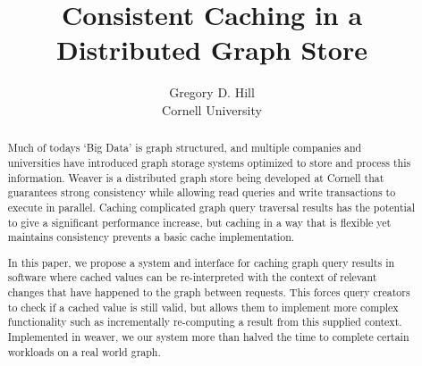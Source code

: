 \documentclass[letterpaper,twocolumn,11pt,tight]{article}
\begin{document}
\newtheorem{claim}{Claim}
\newtheorem{defn}{Definition}
\newcommand{\hilight}[1]{\colorbox{yellow}{#1}}
\newcommand{\secref}[1]{Section~\ref{sec:#1}}
\newcommand{\figref}[1]{Figure~\ref{fig:#1}}
\newcommand{\srcref}[1]{Figure~\ref{fig:#1}}
\newcommand{\clmref}[1]{Claim~\ref{claim:#1}}
\newcommand{\insertfig}[4]{\begin{figure}\centering\texttt{[image: \#2]}\caption{#3}\label{fig:#4}\end{figure}}
\newcommand{\insertsrc}[3]{\begin{figure}\centering\caption{#2}\label{fig:#3}\end{figure}}

\title{Consistent Caching in a Distributed Graph Store}

\author{\rm Gregory D. Hill \qquad
        \\Cornell University}

\maketitle
\begin{abstract}
Much of todays `Big Data' is graph structured, and multiple companies and universities have introduced graph storage systems optimized to store and process this information.
Weaver is a distributed graph store being developed at Cornell that guarantees strong consistency while allowing read queries and write transactions to execute in parallel.
Caching complicated graph query traversal results has the potential to give a significant performance increase,
but caching in a way that is flexible yet maintains consistency prevents a basic cache implementation.

In this paper, we propose a system and interface for caching graph query results in software where cached values can be re-interpreted with the context of relevant changes that have happened to the graph between requests.
This forces query creators to check if a cached value is still valid, but allows them to implement more complex functionality such as incrementally re-computing a result from this supplied context.
Implemented in weaver, we our system more than halved the time to complete certain workloads on a real world graph. %
\end{abstract}
\end{document}
